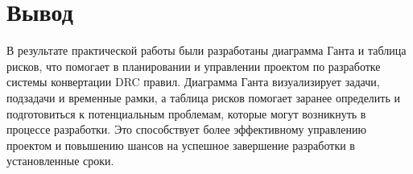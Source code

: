 \clearpage

\section*{\LARGE Вывод}

В результате практической работы
были разработаны диаграмма Ганта и таблица рисков,
что помогает в планировании
и управлении проектом по разработке системы конвертации DRC правил.
Диаграмма Ганта визуализирует задачи, подзадачи и временные рамки,
а таблица рисков помогает заранее определить
и подготовиться к потенциальным проблемам,
которые могут возникнуть в процессе разработки.
Это способствует более эффективному управлению проектом
и повышению шансов на успешное завершение разработки в установленные сроки.


